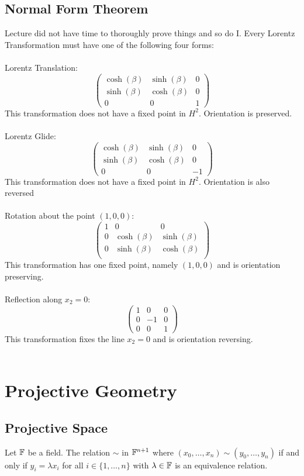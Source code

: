 \documentclass[a4paper]{article}
\begin{document}
\subsection{Normal Form Theorem}
Lecture did not have time to thoroughly prove things and so do I. Every Lorentz Transformation must have one of the following four forms: \\~\\
Lorentz Translation: $$\begin{pmatrix}
\cosh(\beta) & \sinh(\beta) & 0\\
\sinh(\beta) & \cosh(\beta) & 0\\
0 & 0 & 1
\end{pmatrix}$$This transformation does not have a fixed point in $H^2$. Orientation is preserved. \\~\\
Lorentz Glide: $$\begin{pmatrix}
\cosh(\beta) & \sinh(\beta) & 0\\
\sinh(\beta) & \cosh(\beta) & 0\\
0 & 0 & -1
\end{pmatrix}$$This transformation does not have a fixed point in $H^2$. Orientation is also reversed\\~\\
Rotation about the point $(1,0,0)$: $$\begin{pmatrix}
1 & 0 & 0\\
0 & \cosh(\beta) & \sinh(\beta)\\
0 & \sinh(\beta) & \cosh(\beta)\\
\end{pmatrix}$$This transformation has one fixed point, namely $(1,0,0)$ and is orientation preserving. \\~\\
Reflection along $x_2=0$: $$\begin{pmatrix}
1 & 0 & 0\\
0 & -1 & 0\\
0 & 0 & 1
\end{pmatrix}$$This transformation fixes the line $x_2=0$ and is orientation reversing. \\~\\

\pagebreak
\section{Projective Geometry}
\subsection{Projective Space}
\begin{lmm}{}{} Let $\mathbb{F}$ be a field. The relation $\sim$ in $\mathbb{F}^{n+1}$ where $(x_0,\dots,x_n)\sim(y_0,\dots,y_n)$ if and only if $y_i=\lambda x_i$ for all $i\in\{1,\dots,n\}$ with $\lambda\in\mathbb{F}$ is an equivalence relation. 
\end{lmm}
\end{document}
